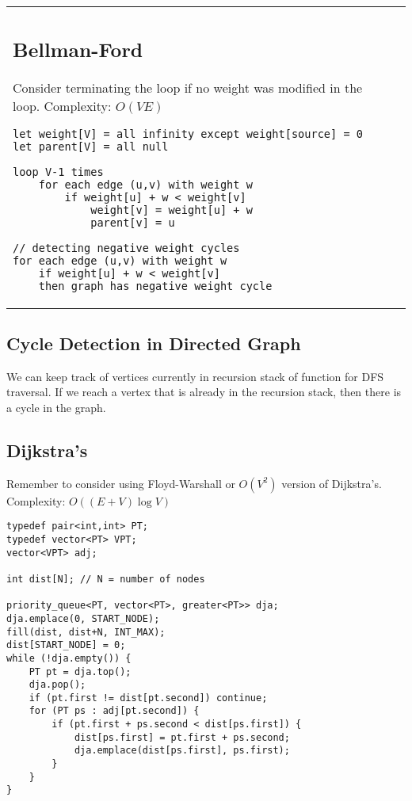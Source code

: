\documentclass[letterpaper]{article}
\begin{document}
\begin{tabular}{@{}p{10cm}p{7.5cm}@{}}
\subsection{Bellman-Ford}

Consider terminating the loop if no weight was modified in the loop. Complexity: $O(VE)$

\begin{lstlisting}
let weight[V] = all infinity except weight[source] = 0
let parent[V] = all null

loop V-1 times
	for each edge (u,v) with weight w
		if weight[u] + w < weight[v]
			weight[v] = weight[u] + w
			parent[v] = u

// detecting negative weight cycles
for each edge (u,v) with weight w
	if weight[u] + w < weight[v]
	then graph has negative weight cycle
\end{lstlisting}

\end{tabular}

\clearpage

\subsection{Cycle Detection in Directed Graph}

We can keep track of vertices currently in recursion stack of function for DFS traversal. If we reach a vertex that is already in the recursion stack, then there is a cycle in the graph.

\subsection{Dijkstra's}

Remember to consider using Floyd-Warshall or $O\left(V^2\right)$ version of Dijkstra's. Complexity: $O\left(\left(E+V\right)\log V\right)$

\begin{lstlisting}
typedef pair<int,int> PT;
typedef vector<PT> VPT;
vector<VPT> adj;

int dist[N]; // N = number of nodes

priority_queue<PT, vector<PT>, greater<PT>> dja;
dja.emplace(0, START_NODE);
fill(dist, dist+N, INT_MAX);
dist[START_NODE] = 0;
while (!dja.empty()) {
	PT pt = dja.top();
	dja.pop();
	if (pt.first != dist[pt.second]) continue;
	for (PT ps : adj[pt.second]) {
		if (pt.first + ps.second < dist[ps.first]) {
			dist[ps.first] = pt.first + ps.second;
			dja.emplace(dist[ps.first], ps.first);
		}
	}
}
\end{lstlisting}
\end{document}
